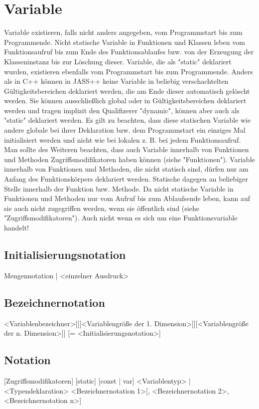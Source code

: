 \chapter{Variable}
Variable existieren, falls nicht anders angegeben, vom Programmstart bis zum Programmende. Nicht statische Variable in Funktionen und
Klassen leben vom Funktionsaufruf bis zum Ende des Funktionsablaufes bzw. von der Erzeugung der Klasseninstanz
bis zur Löschung dieser.
Variable, die als "static" deklariert wurden, existieren ebenfalls vom Programmstart bis zum Programmende.
Anders als in C++ können in JASS++ keine Variable in beliebig verschachtelten Gültigkeitsbereichen deklariert werden, die am Ende dieser
automatisch gelöscht werden.
Sie können ausschließlich global oder in Gültigkeitsbereichen deklariert werden und tragen implizit den Qualifizerer "dynamic",
können aber auch als "static" deklariert werden. Es gilt zu beachten, dass diese statischen Variable wie andere globale
bei ihrer Deklaration bzw. dem Programmstart ein einziges Mal initialisiert werden und nicht wie bei lokalen z. B. bei jedem Funktionsaufruf.
Man sollte des Weiteren beachten, dass auch Variable innerhalb von Funktionen und Methoden Zugriffsmodifikatoren haben können (siehe "Funktionen").
Variable innerhalb von Funktionen und Methoden, die nicht statisch sind, dürfen nur am Anfang des Funktionskörpers deklariert werden.
Statische dagegen an beliebiger Stelle innerhalb der Funktion bzw. Methode.
Da nicht statische Variable in Funktionen und Methoden nur vom Aufruf bis zum Ablaufsende leben, kann auf sie auch nicht zugegriffen werden, wenn sie
öffentlich sind (siehe "Zugriffsmodifikatoren"). Auch nicht wenn es sich um eine Funktionsvariable handelt!

\section{Initialisierungsnotation}
Mengennotation | <einzelner Ausdruck>

\section{Bezeichnernotation}
<Variablenbezeichner>[[[<Variablengröße der 1. Dimension>]][<Variablengröße der n. Dimension>]] [= <Initialisierungsnotation>]

\section{Notation}
[Zugriffsmodifikatoren] [static] [const | var] <Variablentyp> | <Typendeklaration> <Bezeichnernotation 1>[, <Bezeichnernotation 2>, <Bezeichnernotation n>]

